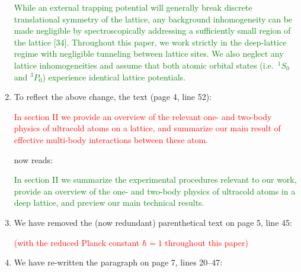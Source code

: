\documentclass[preprint,showkeys,nofootinbib]{revtex4-1}
\newcommand{\1}{\mathds{1}}
\newcommand{\red}[1]{\textcolor{red}{#1}}
\newcommand{\green}[1]{\textcolor{green}{#1}}
\newcounter{point}
\newcommand{\step}{\stepcounter{point}\setcounter{enumi}{0}}
\begin{document}
\begin{enumerate}[label=(R1.\arabic{point}.\arabic*)]
  \green{While an external trapping potential will generally break
    discrete translational symmetry of the lattice, any background
    inhomogeneity can be made negligible by spectroscopically
    addressing a sufficiently small region of the lattice [34].
    Throughout this paper, we work strictly in the deep-lattice regime
    with negligible tunneling between lattice sites.  We also neglect
    any lattice inhomogeneities and assume that both atomic orbital
    states (i.e.~${}^1S_0$ and ${}^3P_0$) experience identical lattice
    potentials.}


\item To reflect the above change, the text (page 4, line 52):

  \red{In section II we provide an overview of the relevant one- and
    two-body physics of ultracold atoms on a lattice, and summarize
    our main result of effective multi-body interactions between these
    atom.}

  now reads:

  \green{In section II we summarize the experimental procedures
    relevant to our work, provide an overview of the one- and two-body
    physics of ultracold atoms in a deep lattice, and preview our main
    technical results.}


\item We have removed the (now redundant) parenthetical text on page
  5, line 45:

  \red{(with the reduced Planck constant $\hbar=1$ throughout this
    paper)}


  \step
\item We have re-written the paragraph on page 7, lines 20--47:


\end{enumerate}
\end{document}
